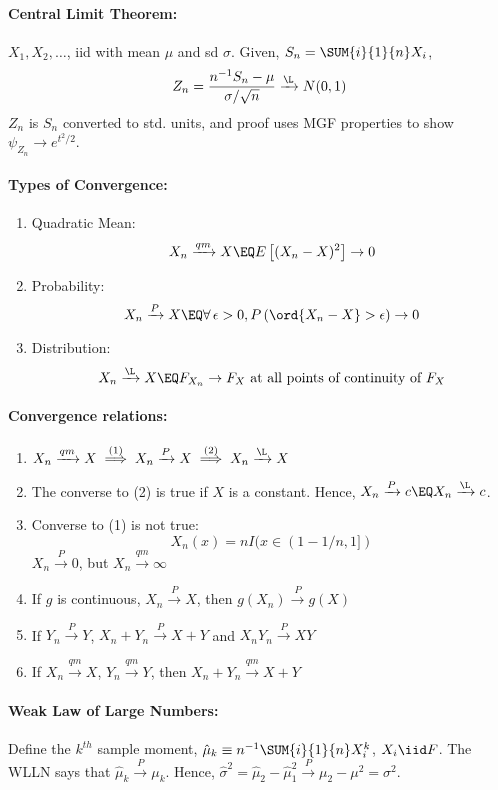 \documentclass[10pt]{article}
\begin{document}
\begin{multicols}{2}
\paragraph{Central Limit Theorem:} $X_1, X_2, \ldots$, iid with mean $\mu$ and sd $\sigma$. Given, $S_n = \SUM{i}{1}{n} X_i$,
\[
Z_n = \frac{n^{-1} S_n - \mu}{\sigma/\sqrt{n}} \xrightarrow{\L} N(0,1)
\]
$Z_n$ is $S_n$ converted to std. units, and proof uses MGF properties to show $\psi_{Z_n} \to e^{t^2/2}$.

\paragraph{Types of Convergence:}
\begin{enumerate}
\item Quadratic Mean: \[X_n \xrightarrow{qm} X \EQ E\left[ (X_n - X)^2 \right] \to 0\]
\item Probability:
\[
X_n \xrightarrow{P} X \EQ \forall \, \epsilon > 0, P\left(\ord{X_n-X} > \epsilon\right) \to 0
\]
\item Distribution:
\[
X_n \xrightarrow{\L} X \EQ F_{X_n} \to F_{X} \text{ at all points of continuity of $F_X$}
\]
\end{enumerate}

\paragraph{Convergence relations:}
\begin{enumerate}
\item $X_n \xrightarrow{qm} X \stackrel{(1)}{\implies} X_{n} \xrightarrow{P} X \stackrel{(2)}{\implies} X_n \xrightarrow{\L} X$
\item The converse to (2) is true if $X$ is a constant. Hence, $X_n \xrightarrow{P} c \EQ X_{n} \xrightarrow{\L} c$.
\item Converse to (1) is not true:
\[
X_{n}(x) = n I(x \in (1-1/n,1])
\]
$X_n \xrightarrow{P} 0$, but $X_n \xrightarrow{qm} \infty$
\item If $g$ is continuous, $X_n \xrightarrow{P} X$, then $g(X_n) \xrightarrow{P} g(X)$
\item If $Y_n \xrightarrow{P} Y$, $X_n + Y_n \xrightarrow{P} X+ Y$ and $X_n Y_n \xrightarrow{P} XY$
\item If $X_n \xrightarrow{qm} X$, $Y_n \xrightarrow{qm} Y$, then $X_n + Y_n \xrightarrow{qm} X+Y$
\end{enumerate}

\paragraph{Weak Law of Large Numbers:} Define the $k^{th}$ sample moment, $\hat{\mu}_{k} \equiv n^{-1}\SUM{i}{1}{n} X_{i}^{k}$, $X_i \iid F$. The WLLN says that $\hat{\mu}_{k} \xrightarrow{P} \mu_{k}$. Hence, $\hat{\sigma}^2 = \hat{\mu}_{2} - \hat{\mu}_{1}^{2} \xrightarrow{P} \mu_{2} - \mu^2 = \sigma^2$.


\end{multicols}
\end{document}
